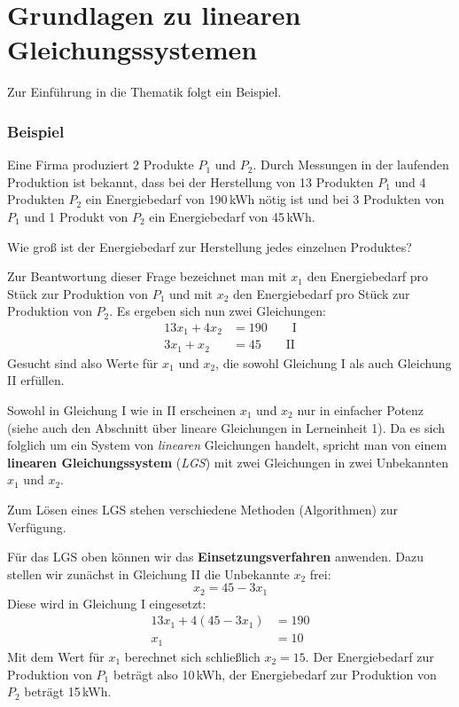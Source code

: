 \section{Grundlagen zu linearen Gleichungssystemen}


Zur Einführung in die Thematik folgt ein Beispiel.

\subsubsection{Beispiel}

Eine Firma produziert 2 Produkte $P_1$ und $P_2$. Durch Messungen in der laufenden Produktion ist bekannt, dass bei der Herstellung von 13 Produkten $P_1$ und 4 Produkten $P_2$ ein Energiebedarf von 190\,kWh nötig ist und bei 3 Produkten von $P_1$ und 1 Produkt von $P_2$ ein Energiebedarf von 45\,kWh.

Wie groß ist der Energiebedarf zur Herstellung jedes einzelnen Produktes?

Zur Beantwortung dieser Frage bezeichnet man mit $x_1$ den Energiebedarf pro Stück zur Produktion von $P_1$ und mit $x_2$ den Energiebedarf pro Stück zur Produktion von $P_2$. Es ergeben sich nun zwei Gleichungen:
\begin{align*}
  13x_1 + 4x_2 &= 190 \qquad \text{I}\\
  3x_1 + x_2 &= 45 \qquad \text{II}
\end{align*}
Gesucht sind also Werte für $x_1$ und $x_2$, die sowohl Gleichung I als auch Gleichung II erfüllen.

Sowohl in Gleichung I wie in II erscheinen $x_1$ und $x_2$ nur in einfacher Potenz (siehe auch den Abschnitt über lineare Gleichungen in Lerneinheit 1). Da es sich folglich um ein System von \emph{linearen} Gleichungen handelt, spricht man von einem \textbf{linearen Gleichungssystem} (\textit{LGS}) mit zwei Gleichungen in zwei Unbekannten $x_1$ und $x_2$.

Zum Lösen eines LGS stehen verschiedene Methoden (Algorithmen) zur Verfügung.

Für das LGS oben können wir das \textbf{Einsetzungsverfahren} anwenden. Dazu stellen wir zunächst in Gleichung II die Unbekannte $x_2$ frei:
\[ x_2 = 45 - 3x_1 \]
Diese wird in Gleichung I eingesetzt:
\begin{align*}
  13x_1 + 4(45 - 3x_1) &= 190\\
  x_1 &= 10
\end{align*}
Mit dem Wert für $x_1$ berechnet sich schließlich $x_2 = 15$. Der Energiebedarf zur Produktion von $P_1$ beträgt also 10\,kWh, der Energiebedarf zur Produktion von $P_2$ beträgt 15\,kWh.

